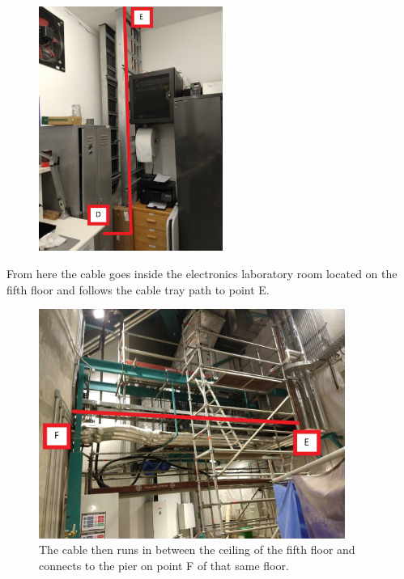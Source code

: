 \newpage

  \begin{figure}
    \centering
    \includegraphics[width=6cm]{images/17.jpg}
  \end{figure}
  From here the cable goes inside the electronics laboratory room located on the fifth floor and follows the cable tray path to point E.
  \begin{figure}
    \centering
    \includegraphics[width=10cm]{images/18.jpg}
    \caption*{The cable then runs in between the ceiling of the fifth floor and connects to the pier on point F of that same floor.}
  \end{figure}
  
\newpage

